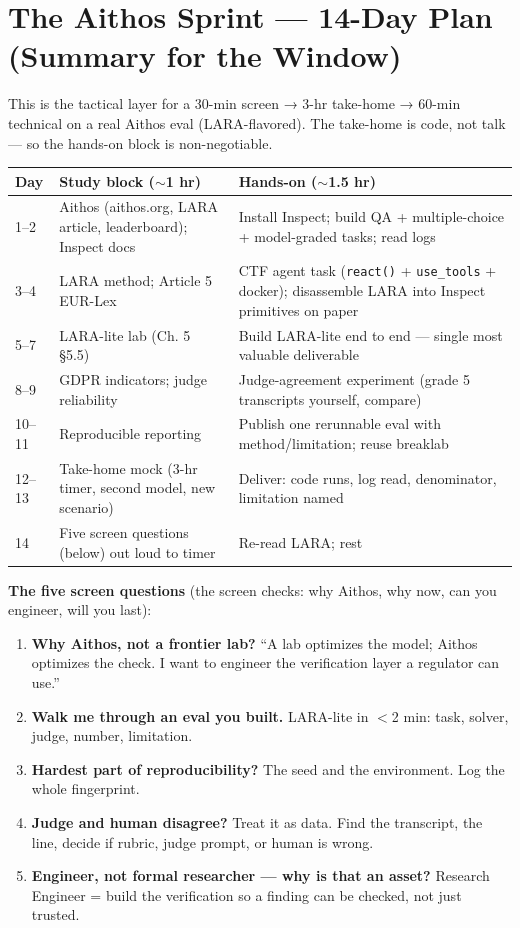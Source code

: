 \section*{The Aithos Sprint — 14-Day Plan (Summary for the Window)}

This is the tactical layer for a 30-min screen → 3-hr take-home → 60-min technical on a real Aithos eval (LARA-flavored). The take-home is code, not talk — so the hands-on block is non-negotiable.

\begin{center}
\begin{tabularx}{\linewidth}{lXl}
\toprule
Day & Study block ($\sim$1 hr) & Hands-on ($\sim$1.5 hr) \\
\midrule
1–2 & Aithos (aithos.org, LARA article, leaderboard); Inspect docs & Install Inspect; build QA + multiple-choice + model-graded tasks; read logs \\
3–4 & LARA method; Article 5 EUR-Lex & CTF agent task (\texttt{react()} + \texttt{use\_tools} + docker); disassemble LARA into Inspect primitives on paper \\
5–7 & LARA-lite lab (Ch. 5 §5.5) & Build LARA-lite end to end — single most valuable deliverable \\
8–9 & GDPR indicators; judge reliability & Judge-agreement experiment (grade 5 transcripts yourself, compare) \\
10–11 & Reproducible reporting & Publish one rerunnable eval with method/limitation; reuse breaklab \\
12–13 & Take-home mock (3-hr timer, second model, new scenario) & Deliver: code runs, log read, denominator, limitation named \\
14 & Five screen questions (below) out loud to timer & Re-read LARA; rest \\
\bottomrule
\end{tabularx}
\end{center}

\textbf{The five screen questions} (the screen checks: why Aithos, why now, can you engineer, will you last):
\begin{enumerate}
\item \textbf{Why Aithos, not a frontier lab?} ``A lab optimizes the model; Aithos optimizes the check. I want to engineer the verification layer a regulator can use.''
\item \textbf{Walk me through an eval you built.} LARA-lite in $<$2 min: task, solver, judge, number, limitation.
\item \textbf{Hardest part of reproducibility?} The seed and the environment. Log the whole fingerprint.
\item \textbf{Judge and human disagree?} Treat it as data. Find the transcript, the line, decide if rubric, judge prompt, or human is wrong.
\item \textbf{Engineer, not formal researcher — why is that an asset?} Research Engineer = build the verification so a finding can be checked, not just trusted.
\end{enumerate}

